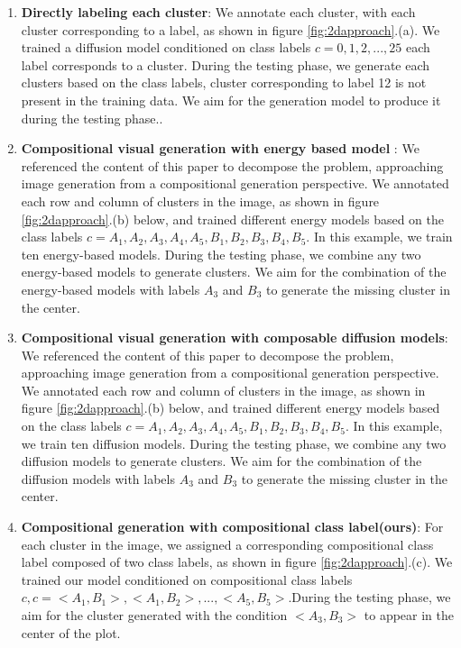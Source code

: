 \begin{enumerate}
    \item \textbf{Directly labeling each cluster}: 
    We annotate each cluster, with each cluster corresponding to a label, as shown in figure \ref{fig:2dapproach}.(a). We trained a diffusion model conditioned on class labels $c = {0, 1, 2, ..., 25}$ each label corresponds to a cluster. During the testing phase, we generate each clusters based on the class labels, cluster corresponding to label 12 is not present in the training data. We aim for the generation model to produce it during the testing phase..
    \item \textbf{Compositional visual generation with energy based model }\cite{du2020compositional}:
    We referenced the content of this paper to decompose the problem, approaching image generation from a compositional generation perspective. We annotated each row and column of clusters in the image, as shown in figure \ref{fig:2dapproach}.(b) below, and trained different energy models based on the class labels $c = {A_1, A_2, A_3, A_4, A_5, B_1, B_2, B_3, B_4, B_5}$. In this example, we train ten energy-based models. During the testing phase, we combine any two energy-based models to generate clusters. We aim for the combination of the energy-based models with labels $A_3$ and $B_3$ to generate the missing cluster in the center.
    \item \textbf{Compositional visual generation with composable diffusion models}\cite{liu2022compositional}:
    We referenced the content of this paper to decompose the problem, approaching image generation from a compositional generation perspective. We annotated each row and column of clusters in the image, as shown in figure \ref{fig:2dapproach}.(b) below, and trained different energy models based on the class labels $c = {A_1, A_2, A_3, A_4, A_5, B_1, B_2, B_3, B_4, B_5}$. In this example, we train ten diffusion models. During the testing phase, we combine any two diffusion models to generate clusters. We aim for the combination of the diffusion models with labels $A_3$ and $B_3$ to generate the missing cluster in the center.
    \item \textbf{Compositional generation with compositional class label(ours)}:
    For each cluster in the image, we assigned a corresponding compositional class label composed of two class labels, as shown in figure \ref{fig:2dapproach}.(c). We trained our model conditioned on compositional class labels $c, c = <A_1, B_1>, <A_1, B_2>, ..., <A_5, B_5>$.During the testing phase, we aim for the cluster generated with the condition $<A_3, B_3>$ to appear in the center of the plot.
\end{enumerate}
